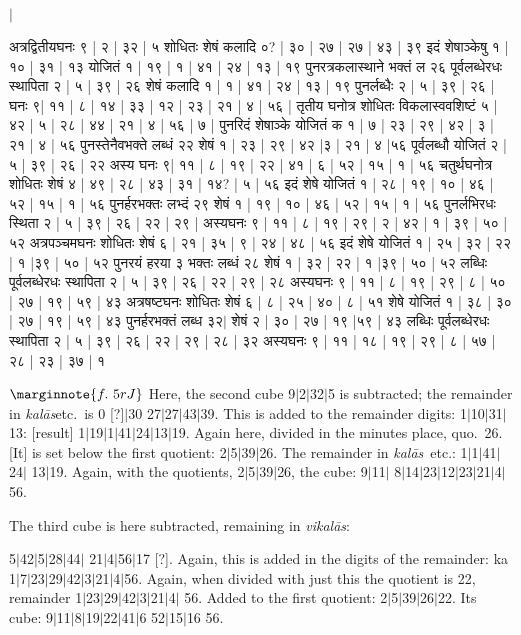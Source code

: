 \documentclass[12pt]{book}
\def\kalas{\textit{ka\-l\=as}}
\def\vikalas{\textit{vi\-ka\-l\=as}}
\def\danda{$|$}
\begin{document}
{\s $|$ 


अत्रद्वितीयघनः ९ | २ | ३२ | ५ शोधितः शेषं कलादि ०? | ३० | २७ | २७ | ४३ | ३९ इदं शेषाञ्केषु १ |
१० | ३१ | १३ योजितं १ | १९ | १ | ४१ | २४ | १३ | १९ पुनरत्रकलास्थाने भक्तं ल २६ पूर्वलब्धेरधः
स्थापिता २ | ५ | ३९ | २६ शेषं कलादि १ | १ | ४१ | २४ | १३ | १९ पुनर्लब्धैः २ | ५ | ३९ | २६ | घनः ९| ११ |
८ | १४ | ३३ | १२ | २३ | २१ | ४ | ५६ | 
तृतीय घनोत्र शोधितः विकलास्ववशिष्टं ५ | ४२ | ५ | २८ | ४४ | २१ | ४ |
५६ | ७ | पुनरिदं शेषाञ्के योजितं क १ | ७ | २३ | २९ | ४२ | ३ | २१ | ४ | ५६ पुनस्तेनैवभक्ते लब्धं
२२ शेषं १ | २३ | २९ | ४२ |३ | २१ | ४ |५६ पूर्वलब्धौ योजितं २ | ५ | ३९ | २६ | २२ अस्य घनः ९| ११ | ८ |
१९ | २२ | ४१ | ६ | ५२ | १५ | १ | ५६ चतुर्थघनोत्र शोधितः शेषं ४ | ४९ | २८ | ४३ | ३१ | १४? | ५ | ५६ इदं
शेषे योजितं १ | २८ | १९ | १० | ४६ | ५२ | १५ | १ | ५६ पुनर्हरभक्तः लभ्दं २९ शेषं १ | १९ | १० | ४६
| ५२ | १५ | १ | ५६ पुनर्लभिरधः स्थिता २ | ५ | ३९ | २६ | २२ | २९ | अस्यघनः ९ | ११ | ८ | १९ | २९ | २ | ४२ | १
| ३९ | ५० | ५२ अत्रपञ्चमघनः शोधितः शेषं ६ | २१ | ३५ | ९ | २४ | ४८ | ५६ इदं शेषे योजितं
१ | २५ | ३२ | २२ | १ |३९ | ५० | ५२ पुनरयं हरया ३ भक्तः लब्धं २८ शेषं १ | ३२ | २२ | १ |३९ | ५० |
५२ लब्धिः पूर्वलब्धेरधः स्थापिता २ | ५ | ३९ | २६ | २२ | २९ | २८ अस्यघनः ९ | ११ | ८ | १९ | २९ | ८ | ५०
| २७ | १९ | ५९ | ४३ अत्रषष्टघनः शोधितः शेषं ६ | ८ | २५ | ४० | ८ | ५१ शेषे योजितं १ | ३८ | ३० |
२७ | १९ | ५९ | ४३ पुनर्हरभक्तं लब्ध ३२$|$
शेषं २ | ३० | २७ | १९ |५९ | ४३ लब्धिः पूर्वलब्धेरधः
स्थापिता २ | ५ | ३९ | २६ | २२ | २९ | २८ | ३२ अस्यघनः ९ | ११ | १८ | १९ | २९ | ८ | ५७ | २८ | २३ | ३७ | १}

\newpage

$\marginnote{f.~5r J}$
Here, the second cube 9\danda 2\danda 32\danda 5 is subtracted; the remainder in \kalas etc.\ 
is 0 [?]\danda 30 27\danda 27\danda 43\danda 39. This is added to the remainder digits:
1\danda 10\danda 31\danda 13: [result] 1\danda 19\danda 1\danda 41\danda 24\danda 13\danda 19.
Again here, divided in the minutes place, quo.\ 26. [It] is set below the first quotient: 
2\danda 5\danda 39\danda 26. The remainder in \kalas\ etc.: 1\danda 1\danda 41\danda 24\danda
13\danda 19. Again, with the quotients, 2\danda 5\danda 39\danda 26, the cube: 9\danda 11\danda
8\danda 14\danda 23\danda 12\danda 23\danda 21\danda 4\danda 56.

The third cube is here subtracted, remaining in \vikalas: 

5\danda 42\danda 5\danda 28\danda 44\danda
21\danda 4\danda 56\danda 17 [?]. Again, this is added in the digits of the remainder: ka
1\danda 7\danda 23\danda 29\danda 42\danda 3\danda 21\danda 4\danda 56. Again, when divided with
just this the quotient is 22, remainder 1\danda 23\danda 29\danda 42\danda 3\danda 21\danda 4\danda
56.  Added to the first quotient: 2\danda 5\danda 39\danda 26\danda 22. Its cube:
9\danda 11\danda 8\danda 19\danda 22\danda 41\danda 6 52\danda 15\danda 16 56.
\end{document}
